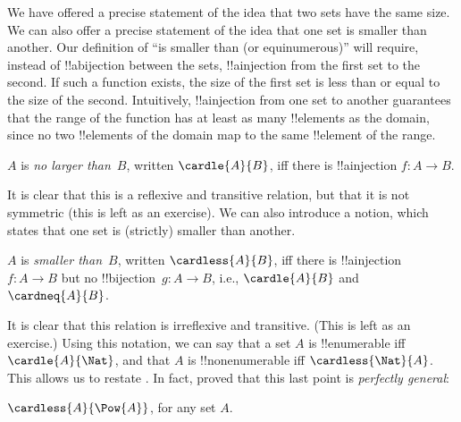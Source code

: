 \documentclass[../../../include/open-logic-section]{subfiles}
\begin{document}

\begin{explain}
We have offered a precise statement of the idea that two sets have the
same size. We can also offer a precise statement of the idea that one
set is smaller than another. Our definition of ``is smaller than (or
equinumerous)'' will require, instead of !!a{bijection} between the
sets, !!a{injection} from the first set to the second. If such a
function exists, the size of the first set is less than or equal to
the size of the second. Intuitively, !!a{injection} from one set to
another guarantees that the range of the function has at least as many
!!{element}s as the domain, since no two !!{element}s of the domain
map to the same !!{element} of the range.
\end{explain}

\begin{defn}
$A$ is \emph{no larger than}~$B$, written $\cardle{A}{B}$, iff there
is !!a{injection} $f \colon A \to B$.
\end{defn}

It is clear that this is a reflexive and transitive relation, but that
it is not symmetric (this is left as an exercise). We can also
introduce a notion, which states that one set is (strictly) smaller
than another. 

\begin{defn}
$A$ is \emph{smaller than}~$B$, written $\cardless{A}{B}$, iff there
is !!a{injection}~$f\colon A \to B$ but no !!{bijection}~$g\colon A
\to B$, i.e., $\cardle{A}{B}$ and $\cardneq{A}{B}$.
\end{defn}

It is clear that this relation is irreflexive
and transitive. (This is left as an exercise.) Using this notation, we
can say that a set $A$ is !!{enumerable} iff $\cardle{A}{\Nat}$, and
that $A$ is !!{nonenumerable} iff $\cardless{\Nat}{A}$. This allows us
to restate
. In fact,
\cite{Cantor1892} proved that this last point is \emph{perfectly
general}:

\begin{thm}[Cantor]
$\cardless{A}{\Pow{A}}$, for any set $A$.
\end{thm}
\end{document}
